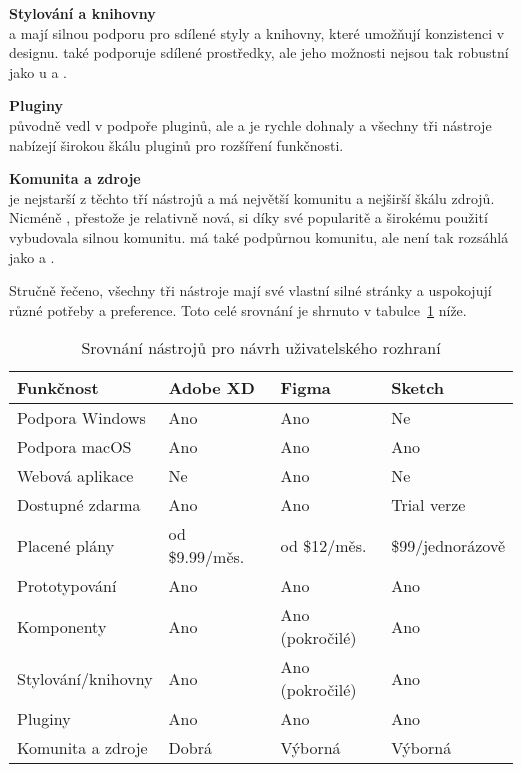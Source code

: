 \textbf{Stylování a knihovny}\\
 a  mají silnou podporu pro sdílené styly a knihovny, které umožňují konzistenci v designu.
 také podporuje sdílené prostředky, ale jeho možnosti nejsou tak robustní jako u  a .

\textbf{Pluginy}\\
 původně vedl v podpoře pluginů, ale  a  je rychle dohnaly a všechny tři nástroje nabízejí širokou škálu pluginů pro rozšíření funkčnosti.

\textbf{Komunita a zdroje}\\
 je nejstarší z těchto tří nástrojů a má největší komunitu a nejširší škálu zdrojů.
Nicméně , přestože je relativně nová, si díky své popularitě a širokému použití vybudovala silnou komunitu.
 má také podpůrnou komunitu, ale není tak rozsáhlá jako  a .

Stručně řečeno, všechny tři nástroje mají své vlastní silné stránky a uspokojují různé potřeby a preference.
Toto celé srovnání je shrnuto v tabulce~\ref{tab:ui-design-tools-comparison} níže.

\begin{table}[h]
    \centering
    \caption{Srovnání nástrojů pro návrh uživatelského rozhraní}
    \label{tab:ui-design-tools-comparison}
    \resizebox{\textwidth}{!}
    {
        \begin{tabular}{llll}
            \toprule
            \textbf{Funkčnost} & \textbf{Adobe XD} & \textbf{Figma} & \textbf{Sketch} \\
            \midrule
            Podpora Windows & Ano & Ano & Ne \\
            Podpora macOS & Ano & Ano & Ano \\
            Webová aplikace & Ne & Ano & Ne \\
            Dostupné zdarma & Ano & Ano & Trial verze \\
            Placené plány & od \$9.99/měs.\ & od \$12/měs.\ & \$99/jednorázově \\
            Prototypování & Ano & Ano & Ano \\
            Komponenty & Ano & Ano (pokročilé) & Ano \\
            Stylování/knihovny & Ano & Ano (pokročilé) & Ano \\
            Pluginy & Ano & Ano & Ano \\
            Komunita a zdroje & Dobrá & Výborná & Výborná \\
            \bottomrule
        \end{tabular}
    }
\end{table}

